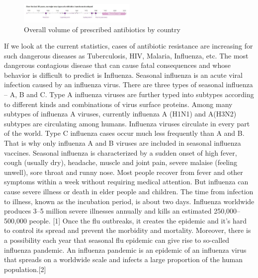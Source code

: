 \begin{figure}[H]
  \centering
  \includegraphics[width=0.5\textwidth]{img/Fig5}
  \caption{Overall volume of prescribed antibiotics by country}
  \label{fig5}
\end{figure}

If we look at the current statistics, cases of antibiotic resistance are increasing for such dangerous diseases as Tuberculosis, HIV, Malaria, Influenza, etc. The most dangerous contagious disease that can cause fatal consequences and whose behavior is difficult to predict is Influenza. Seasonal influenza is an acute viral infection caused by an influenza virus. There are three types of seasonal influenza – A, B and C. Type A influenza viruses are further typed into subtypes according to different kinds and combinations of virus surface proteins. Among many subtypes of influenza A viruses, currently influenza A (H1N1) and A(H3N2) subtypes are circulating among humans. Influenza viruses circulate in every part of the world. Type C influenza cases occur much less frequently than A and B. That is why only influenza A and B viruses are included in seasonal influenza vaccines. Seasonal influenza is characterized by a sudden onset of high fever, cough (usually dry), headache, muscle and joint pain, severe malaise (feeling unwell), sore throat and runny nose. Most people recover from fever and other symptoms within a week without requiring medical attention. But influenza can cause severe illness or death in elder people and children. The time from infection to illness, known as the incubation period, is about two days. Influenza worldwide produces 3–5 million severe illnesses annually and kills an estimated 250,000–500,000 people. [1] Once the flu outbreaks, it creates the epidemic and it’s hard to control its spread and prevent the morbidity and mortality. Moreover, there is a possibility each year that seasonal flu epidemic can give rise to so-called influenza pandemic. An influenza pandemic is an epidemic of an influenza virus that spreads on a worldwide scale and infects a large proportion of the human population.[2]

